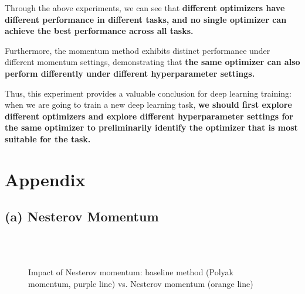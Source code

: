 \documentclass[12pt]{article}
\begin{document}
Through the above experiments, we can see that \textbf{different optimizers have different performance in different tasks, and no single optimizer can achieve the best performance across all tasks.}

Furthermore, the momentum method exhibits distinct performance under different momentum settings, demonstrating that \textbf{the same optimizer can also perform differently under different hyperparameter settings.}

Thus, this experiment provides a valuable conclusion for deep learning training: when we are going to train a new deep learning task, \textbf{we should first explore different optimizers and explore different hyperparameter settings for the same optimizer to preliminarily identify the optimizer that is most suitable for the task.}

\clearpage
\section*{Appendix}
\subsection*{(a) Nesterov Momentum}
\begin{figure}[htbp]
    \centering
     \quad
     \\
     \quad
     \\
     \quad
    \caption{Impact of Nesterov momentum: baseline method (Polyak momentum, purple line) vs. Nesterov momentum (orange line)}
    \label{fig:nesterov_momentum_study}
\end{figure}
\end{document}
